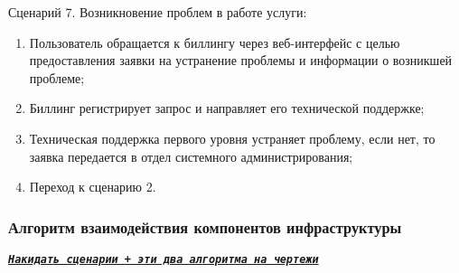 Сценарий 7. Возникновение проблем в работе услуги:
\begin{enumerate}
  \item Пользователь обращается к биллингу через веб-интерфейс с целью предоставления заявки на устранение проблемы и информации о возникшей проблеме;
  \item Биллинг регистрирует запрос и направляет его технической поддержке;
  \item Техническая поддержка первого уровня устраняет проблему, если нет, то заявка передается в отдел системного администрирования;
  \item Переход к сценарию 2.
\end{enumerate}

\subsubsection{Алгоритм взаимодействия компонентов инфраструктуры}

\underline{\texttt{\textit{\textbf{Накидать сценарии + эти два алгоритма на чертежи}}}}

\clearpage

